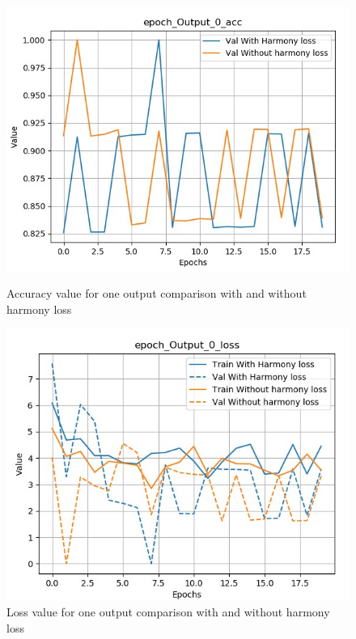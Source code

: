 \documentclass[12pt]{report}
\begin{document}
\begin{figure}[htbp]
    \begin{minipage}{0.5\textwidth}
        \begin{center}
            \includegraphics[width=\textwidth]{images/experiences/harmony-rnn/acc-output-comparison-harmony.jpg}
            \caption{Accuracy value for one output comparison with and without harmony loss}
            \label{fig:acc-output-comparison-harmony}
        \end{center}
    \end{minipage} \hfill
    \begin{minipage}{0.5 \textwidth}
        \begin{center}
            \includegraphics[width=\textwidth]{images/experiences/harmony-rnn/loss-output-comparison-harmony.jpg}
            \caption{Loss value for one output comparison with and without harmony loss}
            \label{fig:loss-output-comparison-harmony}
        \end{center}
    \end{minipage}
\end{figure}
\end{document}

